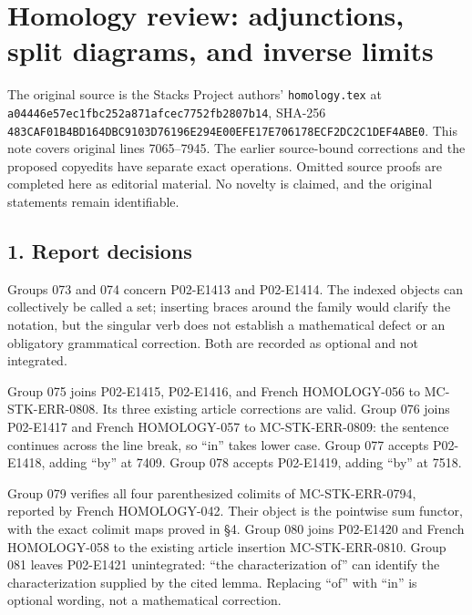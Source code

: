\section{Homology review: adjunctions, split diagrams, and inverse limits}\label{note-09-homology-review-adjunctions-split-diagrams-and-inverse-limits}

The original source is the Stacks Project authors' \texttt{homology.tex} at \texttt{a04446e5\allowbreak{}7ec1fbc2\allowbreak{}52a871af\allowbreak{}cec7752f\allowbreak{}b2807b14}, SHA-256 \texttt{483CAF01\allowbreak{}B4BD164D\allowbreak{}BC9103D7\allowbreak{}6196E294\allowbreak{}E00EFE17\allowbreak{}E706178E\allowbreak{}CF2DC2C1\allowbreak{}DEF4ABE0}. This note covers original lines 7065--7945. The earlier source-bound corrections and the proposed copyedits have separate exact operations. Omitted source proofs are completed here as editorial material. No novelty is claimed, and the original statements remain identifiable.

\subsection{1. Report decisions}\label{note-09-report-decisions}

Groups 073 and 074 concern P02-E1413 and P02-E1414. The indexed objects can collectively be called a set; inserting braces around the family would clarify the notation, but the singular verb does not establish a mathematical defect or an obligatory grammatical correction. Both are recorded as optional and not integrated.

Group 075 joins P02-E1415, P02-E1416, and French HOMOLOGY-056 to MC-STK-ERR-0808. Its three existing article corrections are valid. Group 076 joins P02-E1417 and French HOMOLOGY-057 to MC-STK-ERR-0809: the sentence continues across the line break, so ``in'' takes lower case. Group 077 accepts P02-E1418, adding ``by'' at 7409. Group 078 accepts P02-E1419, adding ``by'' at 7518.

Group 079 verifies all four parenthesized colimits of MC-STK-ERR-0794, reported by French HOMOLOGY-042. Their object is the pointwise sum functor, with the exact colimit maps proved in §4. Group 080 joins P02-E1420 and French HOMOLOGY-058 to the existing article insertion MC-STK-ERR-0810. Group 081 leaves P02-E1421 unintegrated: ``the characterization of'' can identify the characterization supplied by the cited lemma. Replacing ``of'' with ``in'' is optional wording, not a mathematical correction.

